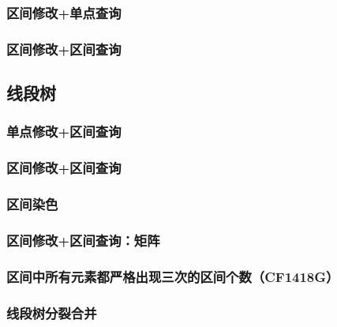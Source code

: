 \documentclass[landscape,twoside,a4paper]{article}
\begin{document}
\subsubsection{区间修改+单点查询}


\subsubsection{区间修改+区间查询}



\subsection{线段树}


\subsubsection{单点修改+区间查询}


\subsubsection{区间修改+区间查询}


\subsubsection{区间染色}


\subsubsection{区间修改+区间查询：矩阵}


\subsubsection{区间中所有元素都严格出现三次的区间个数（CF1418G）}


\subsubsection{线段树分裂合并}

\end{document}
